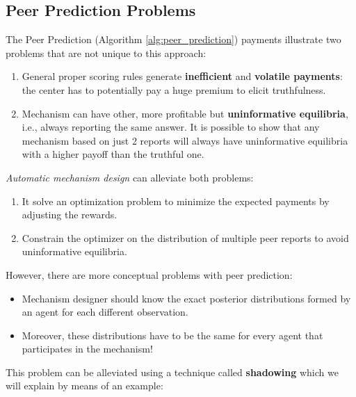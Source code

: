 \documentclass{report}
\theoremstyle{definition}
\begin{document}
\subsection{Peer Prediction Problems}
The Peer Prediction (Algorithm \ref{alg:peer_prediction}) payments illustrate two problems that are not unique to this approach:

\begin{enumerate}
    \item General proper scoring rules generate \textbf{inefficient} and \textbf{volatile payments}: the center has to potentially pay a huge premium to elicit truthfulness.

    \item Mechanism can have other, more profitable but \textbf{uninformative equilibria}, i.e., always reporting the same answer.
    It is possible to show that any mechanism based on just 2 reports will always have uninformative equilibria with a higher payoff than the truthful one.

\end{enumerate}

 \emph{Automatic mechanism design} can alleviate both problems: 
 
 \begin{enumerate}
     \item It solve an optimization problem to minimize the expected payments by adjusting the rewards.
     \item Constrain the optimizer on the distribution of multiple peer reports to avoid uninformative equilibria.
 \end{enumerate}

However, there are more conceptual problems with peer prediction:

\begin{itemize}
 \item Mechanism designer should know the exact posterior distributions formed by an agent for each different observation.
 
 \item Moreover, these distributions have to be the same for every agent that participates in the mechanism!
\end{itemize}

This problem can be alleviated using a technique called \textbf{shadowing} which we will explain by means of an example:
\end{document}
